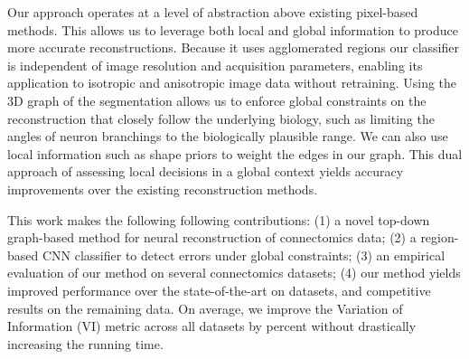 Our approach operates at a level of abstraction above existing pixel-based methods. This allows us to leverage both local and global information to produce more accurate reconstructions. Because it uses agglomerated regions our classifier is independent of image resolution and acquisition parameters, enabling its application to isotropic and anisotropic image data without retraining. Using the 3D graph of the segmentation allows us to enforce global constraints on the reconstruction that closely follow the underlying biology, such as limiting the angles of neuron branchings to the biologically plausible range. We can also use local information such as shape priors to weight the edges in our graph. This dual approach of assessing local decisions in a global context yields accuracy improvements over the existing reconstruction methods.

This work makes the following following contributions: (1) a novel top-down graph-based method for neural reconstruction of connectomics data; (2) a region-based CNN classifier to detect errors under global constraints; (3) an empirical evaluation of our method on several connectomics datasets; (4) our method yields improved performance over the state-of-the-art on  datasets, and competitive results on the remaining data. On average, we improve the Variation of Information (VI) metric across all datasets by  percent without drastically increasing the running time.

